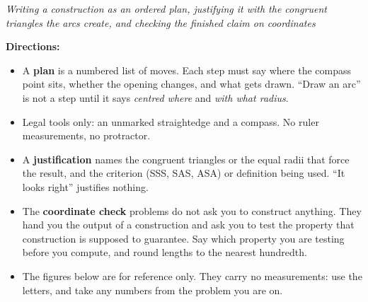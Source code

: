 \documentclass[12pt]{article}
\begin{document}

\begin{center}\small\textit{Writing a construction as an ordered plan, justifying it with
the congruent triangles the arcs create, and checking the finished claim on
coordinates}\end{center}

\noindent\small\textbf{Directions:}
\begin{itemize}[label={$\bullet$}, leftmargin=1.1cm, itemsep=1pt, topsep=2pt]
  \item A \textbf{plan} is a numbered list of moves. Each step must say where the compass
        point sits, whether the opening changes, and what gets drawn. ``Draw an arc'' is
        not a step until it says \emph{centred where} and \emph{with what radius}.
  \item Legal tools only: an unmarked straightedge and a compass. No ruler measurements,
        no protractor.
  \item A \textbf{justification} names the congruent triangles or the equal radii that
        force the result, and the criterion (SSS, SAS, ASA) or definition being used.
        ``It looks right'' justifies nothing.
  \item The \textbf{coordinate check} problems do not ask you to construct anything. They
        hand you the output of a construction and ask you to test the property that
        construction is supposed to guarantee. Say which property you are testing before
        you compute, and round lengths to the nearest hundredth.
  \item The figures below are for reference only. They carry no measurements: use the
        letters, and take any numbers from the problem you are on.
\end{itemize}
\normalsize
\end{document}
